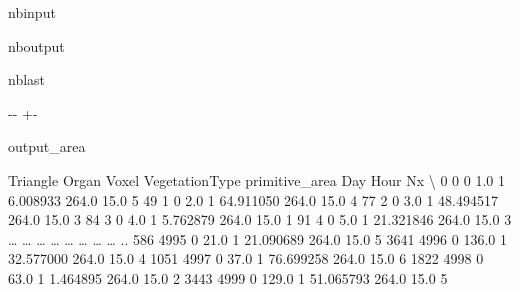 \documentclass[letterpaper,10pt,english]{sphinxmanual}
\begin{document}
\begin{sphinxuseclass}{nbinput}
{
\begin{sphinxVerbatim}[commandchars=\\\{\}]
\llap{\color{nbsphinxin}[23]:\,\hspace{\fboxrule}\hspace{\fboxsep}}
\end{sphinxVerbatim}
}

\end{sphinxuseclass}
\begin{sphinxuseclass}{nboutput}
\begin{sphinxuseclass}{nblast}
{

\kern-\sphinxverbatimsmallskipamount\kern-\baselineskip
\kern+\FrameHeightAdjust\kern-\fboxrule
\vspace{\nbsphinxcodecellspacing}

\begin{sphinxuseclass}{output_area}
\begin{sphinxuseclass}{}


\begin{sphinxVerbatim}[commandchars=\\\{\}]
      Triangle  Organ  Voxel  VegetationType  primitive\_area    Day  Hour  Nx  \textbackslash{}
0            0      0    1.0               1        6.008933  264.0  15.0   5
49           1      0    2.0               1       64.911050  264.0  15.0   4
77           2      0    3.0               1       48.494517  264.0  15.0   3
84           3      0    4.0               1        5.762879  264.0  15.0   1
91           4      0    5.0               1       21.321846  264.0  15.0   3
{\ldots}        {\ldots}    {\ldots}    {\ldots}             {\ldots}             {\ldots}    {\ldots}   {\ldots}  ..
586       4995      0   21.0               1       21.090689  264.0  15.0   5
3641      4996      0  136.0               1       32.577000  264.0  15.0   4
1051      4997      0   37.0               1       76.699258  264.0  15.0   6
1822      4998      0   63.0               1        1.464895  264.0  15.0   2
3443      4999      0  129.0               1       51.065793  264.0  15.0   5


\end{sphinxVerbatim}
\end{sphinxuseclass}
\end{sphinxuseclass}}
\end{sphinxuseclass}
\end{sphinxuseclass}
\end{document}
